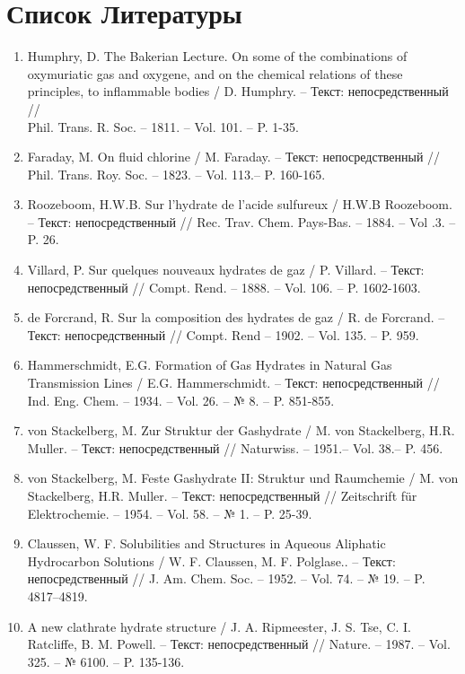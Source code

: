 \chapter*{Список Литературы}
\begin{enumerate}
    \item Humphry, D. The Bakerian Lecture. On some of the combinations of \\ oxymuriatic gas and oxygene, and on the chemical relations of these principles, to inflammable bodies / D. Humphry. -- Текст: непосредственный // \\ Phil. Trans. R. Soc. -- 1811. -- Vol. 101. -- P. 1-35.
    \item Faraday, M.  On fluid chlorine / M. Faraday. -- Текст: непосредственный // Phil. Trans. Roy. Soc. -- 1823. -- Vol. 113.-- P. 160-165.
    \item Roozeboom, H.W.B. Sur l'hydrate de l'acide sulfureux / H.W.B Roozeboom. -- Текст: непосредственный // Rec. Trav. Chem. Pays-Bas. -- 1884. -- Vol .3. -- P. 26.
    \item Villard, P. Sur quelques nouveaux hydrates de gaz / P. Villard. -- Текст: \\ непосредственный // Compt. Rend. -- 1888. -- Vol. 106. -- P. 1602-1603.
    \item de Forcrand, R. Sur la composition des hydrates de gaz / R. de Forcrand. -- Текст: непосредственный // Compt. Rend -- 1902. -- Vol. 135. -- P. 959.
    \item Hammerschmidt, E.G. Formation of Gas Hydrates in Natural Gas \\ Transmission Lines / E.G. Hammerschmidt. -- Текст: непосредственный // Ind. Eng. Chem. -- 1934. -- Vol. 26. -- № 8. -- P. 851-855.
    \item von Stackelberg, M. Zur Struktur der Gashydrate / M. von Stackelberg, H.R. Muller. -- Текст: непосредственный // Naturwiss. -- 1951.-- Vol. 38.-- P. 456.
    \item von Stackelberg, M. Feste Gashydrate II: Struktur und Raumchemie / M. von Stackelberg, H.R. Muller. -- Текст: непосредственный // Zeitschrift für Elektrochemie. -- 1954. -- Vol. 58. -- № 1. -- P. 25-39.
    \item Claussen, W. F. Solubilities and Structures in Aqueous Aliphatic Hydrocarbon Solutions / W. F. Claussen, M. F. Polglase.. -- Текст: непосредственный // J. Am. Chem. Soc. -- 1952. -- Vol. 74. -- № 19. -- P. 4817--4819.
    \item A new clathrate hydrate structure / J. A. Ripmeester, J. S. Tse, C. I. Ratcliffe, B. M. Powell. -- Текст: непосредственный // Nature. -- 1987. -- Vol. 325. -- № 6100. -- P. 135-136.

\end{enumerate}
